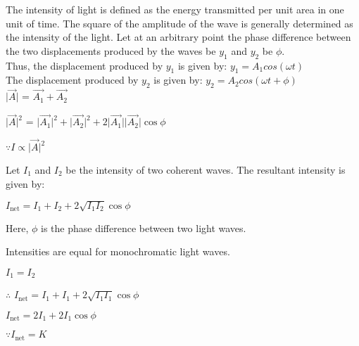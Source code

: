 \documentclass[journal,12pt,twocolumn]{IEEEtran}
\theoremstyle{remark}
\begin{document}
The intensity of light is defined as the energy transmitted per unit area in one unit of time. The square of the amplitude of the wave is generally determined as the intensity of the light. 
Let at an arbitrary point the phase difference between the two displacements produced by the waves be $y_1$ and $y_2$ be $\phi$.\\
Thus, the displacement produced by $y_1$ is given by:
\hspace*{1cm} $y_1 = A_1cos(\omega t )$ \\
The displacement produced by $y_2$ is given by:
\hspace*{1cm} $y_2 = A_2cos(\omega t + \phi)$ \\

\hspace*{1.8cm}$\lvert \overrightarrow{A} \rvert$ = $\overrightarrow{A_1} + \overrightarrow{A_2}$ 

\vspace{0.2cm}

\hspace*{0.9cm}$\lvert \overrightarrow{A} \rvert^2$ = $\lvert\overrightarrow{A_1}\rvert^2 +\lvert \overrightarrow{A_2}\rvert^2 + 2\lvert\overrightarrow{A_1}\rvert\lvert\overrightarrow{A_2}\rvert \cos \phi$

\vspace{0.2cm}

\hspace*{1cm}$\because I \propto \lvert\overrightarrow{A}\rvert^2$

\vspace{0.2cm}

Let $I_1$ and $I_2$ be the intensity of two coherent waves. The resultant intensity is given by:

$I_{\text{net}} = I_1 + I_2 + 2\sqrt{I_1I_2}\cos{\phi}$

Here, $\phi$ is the phase difference between two light waves.

Intensities are equal for monochromatic light waves.

\hspace{1cm}$I_1 = I_2$

$\therefore$ $I_{\text{net}} = I_1 + I_1 + 2\sqrt{I_1I_1}\cos{\phi}$

\vspace{0.2cm}

       \hspace{0.2cm}      $I_{\text{net}} = 2I_1 + 2I_1\cos{\phi}$

$\because I_{\text{net}} = K$
\end{document}
